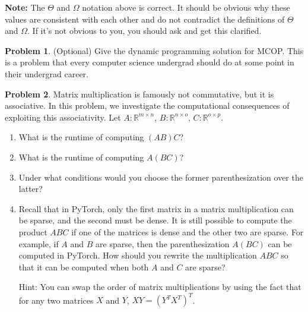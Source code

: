 \documentclass[10pt]{article}
\theoremstyle{definition}
\newtheorem{problem}{Problem}
\newcommand{\R}{\mathbb R}
\newcommand{\trans}[1]{{#1}^{T}}
\begin{document}
\textbf{Note:}
The $\Theta$ and $\Omega$ notation above is correct.
It should be obvious why these values are consistent with each other and do not contradict the definitions of $\Theta$ and $\Omega$.
If it's not obvious to you, you should ask and get this clarified.

\begin{problem}
    (Optional)
    Give the dynamic programming solution for MCOP.
    This is a problem that every computer science undergrad should do at some point in their undergrad career.
    \vspace{4in}
\end{problem}

\begin{problem}
    Matrix multiplication is famously not commutative, but it is associative.
    In this problem, we investigate the computational consequences of exploiting this associativity.
    Let $A : \R^{m\times n}$, $B : \R^{n\times o}$, $C : \R^{o\times p}$.

    \begin{enumerate}
        \item What is the runtime of computing $(AB)C$?
            \vspace{1in}
        \item What is the runtime of computing $A(BC)$?
            \vspace{1in}
        \item Under what conditions would you choose the former parenthesization over the latter?
            \vspace{1in}
        \item
            Recall that in PyTorch, only the first matrix in a matrix multiplication can be sparse,
            and the second must be dense.
            It is still possible to compute the product $ABC$ if one of the matrices is dense and the other two are sparse.
            For example, if $A$ and $B$ are sparse, then the parenthesization $A(BC)$ can be computed in PyTorch.
            How should you rewrite the multiplication $ABC$ so that it can be computed when both $A$ and $C$ are sparse?

            \noindent
            Hint: You can swap the order of matrix multiplications by using the fact that for any two matrices $X$ and $Y$, $XY = \trans{(\trans Y \trans X)}$.
            \vspace{2in}
    \end{enumerate}
\end{problem}
\end{document}

